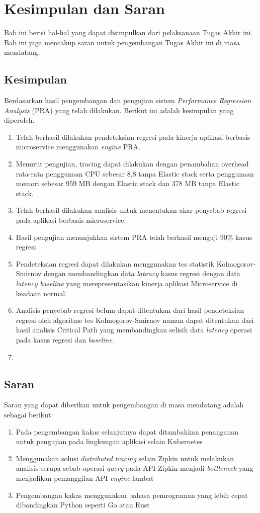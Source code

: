 \chapter{Kesimpulan dan Saran}
Bab ini berisi hal-hal yang dapat disimpulkan dari pelaksanaan Tugas Akhir ini. Bab ini juga mencakup saran untuk pengembangan Tugas Akhir ini di masa mendatang.

\section{Kesimpulan}
Berdasarkan hasil pengembangan dan pengujian sistem \textit{Performance Regression Analysis} (PRA) yang telah dilakukan. Berikut ini adalah kesimpulan yang diperoleh.
\begin{enumerate}
	\item Telah berhasil dilakukan pendeteksian regresi pada kinerja aplikasi berbasis microservice menggunakan \textit{engine} PRA.
	\item Menurut pengujian, tracing dapat dilakukan dengan penambahan overhead
	rata-rata penggunaan CPU sebesar 8,8%
	tanpa Elastic stack serta penggunaan memori sebesar 959 MB dengan
	Elastic stack dan 378 MB tanpa Elastic stack.
	\item Telah berhasil dilakukan analisis untuk menentukan akar penyebab regresi pada aplikasi berbasis microservice.
	\item Hasil pengujian menunjukkan sistem PRA telah berhasil menguji 90\% kasus regresi.
	\item Pendeteksian regresi dapat dilakukan menggunakan tes statistik Kolmogorov-Smirnov dengan membandingkan data \textit{latency} kasus regresi dengan data \textit{latency} \textit{baseline} yang merepresentasikan kinerja aplikasi Microservice di keadaan normal.
	\item Analisis penyebab regresi belum dapat ditentukan dari hasil pendeteksian regresi oleh algoritme tes Kolmogorov-Smirnov namun dapat ditentukan dari hasil analisis Critical Path yang membandingkan selisih data \textit{latency} operasi pada kasus regresi dan \textit{baseline}.
	\item 
\end{enumerate}

\section{Saran}
Saran yang dapat diberikan untuk pengembangan di masa mendatang adalah sebagai berikut:
\begin{enumerate}
	\item Pada pengembangan kakas selanjutnya dapat ditambahkan penanganan untuk pengujian pada lingkungan aplikasi selain Kubernetes
	\item Menggunakan solusi \textit{distributed tracing} selain Zipkin untuk melakukan analisis serupa sebab operasi \textit{query} pada API Zipkin menjadi \textit{bottleneck} yang menjadikan pemanggilan API \textit{engine} lambat
	\item Pengembangan kakas menggunakan bahasa pemrograman yang lebih cepat dibandingkan Python seperti Go atau Rust
\end{enumerate}